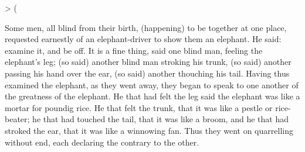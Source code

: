 {    >   
        
     {\RMF(}   
        
   \par}

\ornline{\Sine}

Some men, all blind from their birth, (happening) to be together at one place, requested
earnestly of an elephant-driver to show them an elephant. He said: examine it, and be off.
It is a fine thing, said one blind man, feeling the elephant's leg; (so said) another blind
man stroking his trunk, (so said) another passing his hand over the ear, (so said) another 
thouching his tail. Having thus examined the elephant, as they went away, they began to
speak to one another of the greatness of the elephant. He that had felt the leg said the
elephant was like a mortar for poundig rice. He that felt the trunk, that it was like
a pestle or rice-beater; he that had touched the tail, that it was like a broom, and he that
had stroked the ear, that it was like a winnowing fan. Thus they went on quarrelling
without end, each declaring the contrary to the other.

\ornline{\Orn}

\bye
